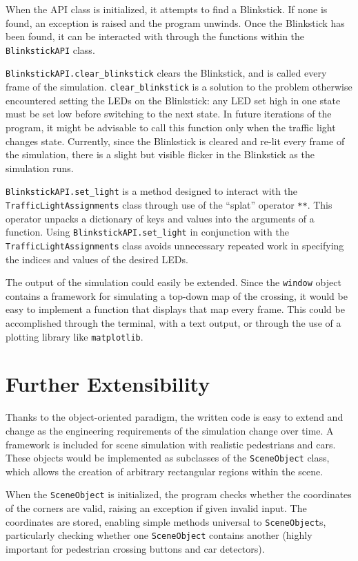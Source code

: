 \documentclass[
  letterpaper,
  DIV=11,
  numbers=noendperiod]{scrartcl}
\begin{document}
When the API class is initialized, it attempts to find a Blinkstick. If
none is found, an exception is raised and the program unwinds. Once the
Blinkstick has been found, it can be interacted with through the
functions within the \texttt{BlinkstickAPI} class.

\texttt{BlinkstickAPI.clear\_blinkstick} clears the Blinkstick, and is
called every frame of the simulation. \texttt{clear\_blinkstick} is a
solution to the problem otherwise encountered setting the LEDs on the
Blinkstick: any LED set high in one state must be set low before
switching to the next state. In future iterations of the program, it
might be advisable to call this function only when the traffic light
changes state. Currently, since the Blinkstick is cleared and re-lit
every frame of the simulation, there is a slight but visible flicker in
the Blinkstick as the simulation runs.

\texttt{BlinkstickAPI.set\_light} is a method designed to interact with
the \texttt{TrafficLightAssignments} class through use of the ``splat''
operator \texttt{**}. This operator unpacks a dictionary of keys and
values into the arguments of a function. Using
\texttt{BlinkstickAPI.set\_light} in conjunction with the
\texttt{TrafficLightAssignments} class avoids unnecessary repeated work
in specifying the indices and values of the desired LEDs.

The output of the simulation could easily be extended. Since the
\texttt{window} object contains a framework for simulating a top-down
map of the crossing, it would be easy to implement a function that
displays that map every frame. This could be accomplished through the
terminal, with a text output, or through the use of a plotting library
like \texttt{matplotlib}.

\hypertarget{further-extensibility}{%
\section{Further Extensibility}\label{further-extensibility}}

Thanks to the object-oriented paradigm, the written code is easy to
extend and change as the engineering requirements of the simulation
change over time. A framework is included for scene simulation with
realistic pedestrians and cars. These objects would be implemented as
subclasses of the \texttt{SceneObject} class, which allows the creation
of arbitrary rectangular regions within the scene.

When the \texttt{SceneObject} is initialized, the program checks whether
the coordinates of the corners are valid, raising an exception if given
invalid input. The coordinates are stored, enabling simple methods
universal to \texttt{SceneObject}s, particularly checking whether one
\texttt{SceneObject} contains another (highly important for pedestrian
crossing buttons and car detectors).
\end{document}
